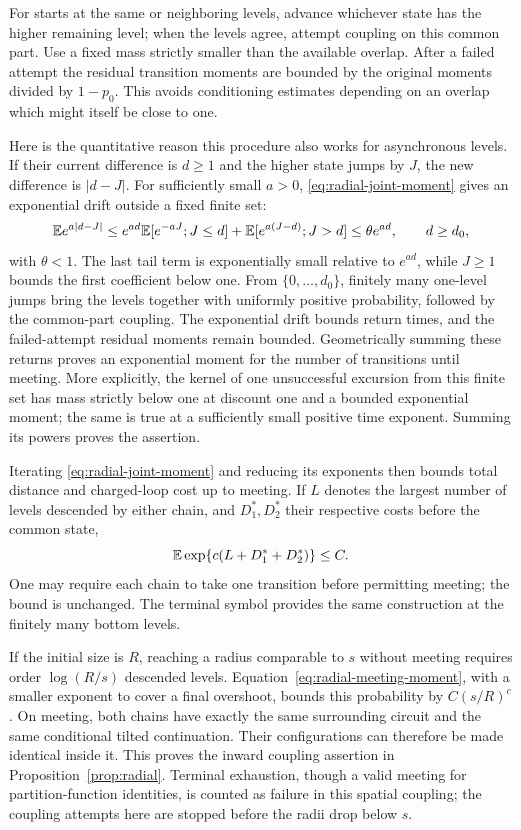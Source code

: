 For starts at the same or neighboring levels, advance whichever
state has the higher remaining level; when the levels agree, attempt
coupling on this common part. Use a fixed mass strictly smaller than
the available overlap. After a failed attempt the residual transition
moments are bounded by the original moments divided by $1-p_0$.
This avoids conditioning estimates depending on an overlap which
might itself be close to one.

Here is the quantitative reason this procedure also works for
asynchronous levels. If their current difference is $d\ge1$ and
the higher state jumps by $J$, the new difference is $|d-J|$.
For sufficiently small $a>0$, \eqref{eq:radial-joint-moment} gives
an exponential drift outside a fixed finite set:
\[
 \mathbb E e^{a|d-J|}
 \le e^{ad}\mathbb E[e^{-aJ};J\le d]
          +\mathbb E[e^{a(J-d)};J>d]
 \le \theta e^{ad},\qquad d\ge d_0,
\]
with $\theta<1$. The last tail term is exponentially small relative
to $e^{ad}$, while $J\ge1$ bounds the first coefficient below one.
From $\{0,\ldots,d_0\}$, finitely many one-level jumps bring the
levels together with uniformly positive probability, followed by
the common-part coupling. The exponential drift bounds return
times, and the failed-attempt residual moments remain bounded.
Geometrically summing these returns proves an exponential moment
for the number of transitions until meeting. More explicitly, the
kernel of one unsuccessful excursion from this finite set has mass
strictly below one at discount one and a bounded exponential moment;
the same is true at a sufficiently small positive time exponent.
Summing its powers proves the assertion.

Iterating \eqref{eq:radial-joint-moment} and reducing its exponents
then bounds total distance and charged-loop cost up to meeting. If
$L$ denotes the largest number of levels descended by either chain,
and $D_1^*,D_2^*$ their respective costs before the common state,
\begin{equation}\label{eq:radial-meeting-moment}
 \mathbb E\exp\{c(L+D_1^*+D_2^*)\}\le C.
\end{equation}
One may require each chain to take one transition before permitting
meeting; the bound is unchanged. The terminal symbol provides the
same construction at the finitely many bottom levels.

If the initial size is $R$, reaching a radius comparable to $s$
without meeting requires order $\log(R/s)$ descended levels.
Equation~\eqref{eq:radial-meeting-moment}, with a smaller exponent
to cover a final overshoot, bounds this probability by $C(s/R)^c$.
On meeting, both chains have exactly the same surrounding circuit
and the same conditional tilted continuation. Their configurations
can therefore be made identical inside it. This proves the inward
coupling assertion in Proposition~\ref{prop:radial}.
Terminal exhaustion, though a valid meeting for partition-function
identities, is counted as failure in this spatial coupling; the
coupling attempts here are stopped before the radii drop below $s$.

